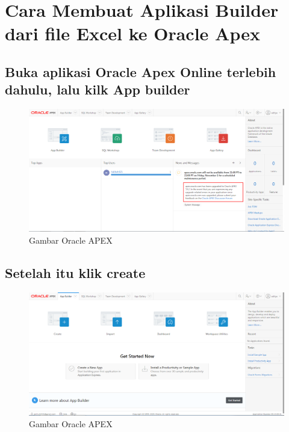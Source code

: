 \documentclass[12pt, times new roman, a4paper]{article}
\begin{document}
\section{Cara Membuat Aplikasi Builder dari file Excel
ke Oracle Apex}

\subsection{ Buka aplikasi Oracle Apex Online terlebih dahulu, lalu kilk App builder}
\begin{figure}[h]
	\centering
		\includegraphics[scale=0.3]{gambar/1}
	\caption{Gambar Oracle APEX}
\end{figure}

\subsection{Setelah itu klik create}
\begin{figure}[h]
	\centering
		\includegraphics[scale=0.3]{gambar/2}
	\caption{Gambar Oracle APEX}
\end{figure}
\end{document}
